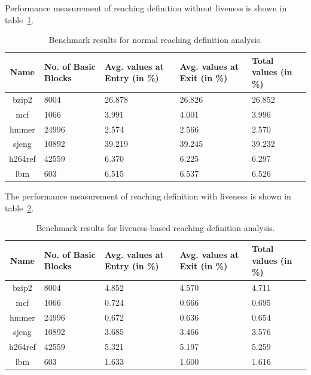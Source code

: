 \documentclass[11pt,a4paper,openright]{report}
\begin{document}
Performance measurement of reaching definition without liveness is shown in table~\ref{tab:performance_without_l}.
\begin{table}[H]
  \begin{center}
    \begin{tabular}{|c|p{1.5cm}|p{2cm}|p{2cm}|p{2cm}|}
    \hline
      Name & No. of Basic Blocks & Avg. values at Entry (in \%) & Avg. values at Exit (in \%) & Total values (in \%)\\
      \hline
   	  bzip2 & 8004 & 26.878 & 26.826 & 26.852 \\ \hline
   	  mcf & 1066 & 3.991 & 4.001 & 3.996 \\ \hline
   	  hmmer & 24996 & 2.574 & 2.566  & 2.570 \\ \hline
   	  sjeng & 10892 & 39.219 & 39.245 & 39.232 \\ \hline
   	  h264ref & 42559 & 6.370 & 6.225 & 6.297\\ \hline
   	  lbm & 603 & 6.515 & 6.537 & 6.526\\ \hline
   	  
	\hline
    \end{tabular}
    \caption{Benchmark results for normal reaching definition analysis.}
      \label{tab:performance_without_l}
  \end{center}
\end{table}



The performance measurement of reaching definition with liveness is shown in table~\ref{tab:performance_with_l}.
\begin{table}[H]
  \begin{center}
    \begin{tabular}{|c|p{1.5cm}|p{2cm}|p{2cm}|p{2cm}|}
    \hline
      Name & No. of Basic Blocks & Avg. values at Entry (in \%) & Avg. values at Exit (in \%) & Total values (in \%)\\
      \hline
   	  bzip2 & 8004 & 4.852 & 4.570 & 4.711 \\ \hline
   	  mcf & 1066 & 0.724 & 0.666 & 0.695 \\ \hline
   	  hmmer & 24996 & 0.672 & 0.636  & 0.654 \\ \hline
   	  sjeng & 10892 & 3.685 & 3.466 & 3.576 \\ \hline
   	  h264ref & 42559 & 5.321 & 5.197 & 5.259\\ \hline
   	  lbm & 603 & 1.633 & 1.600 & 1.616\\ \hline
   	  
	\hline
    \end{tabular}
    \caption{Benchmark results for liveness-based reaching definition analysis.}
      \label{tab:performance_with_l}
  \end{center}
\end{table}
\end{document}
